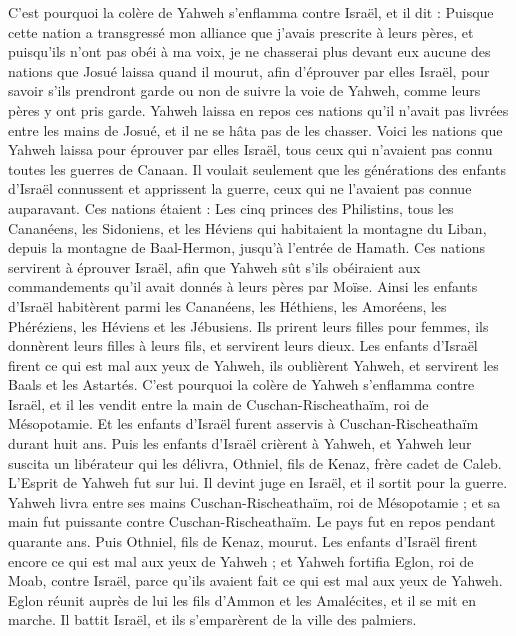 \begin{multicols}{2}
C'est pourquoi la colère de Yahweh s'enflamma contre Israël, et il dit : Puisque cette nation a transgressé mon alliance que j'avais prescrite à leurs pères, et puisqu’ils n'ont pas obéi à ma voix,
je ne chasserai plus devant eux aucune des nations que Josué laissa quand il mourut,
afin d'éprouver par elles Israël, pour savoir s'ils prendront garde ou non de suivre la voie de Yahweh, comme leurs pères y ont pris garde.
Yahweh laissa en repos ces nations qu'il n'avait pas livrées entre les mains de Josué, et il ne se hâta pas de les chasser.
\VerseOne{}Voici les nations que Yahweh laissa pour éprouver par elles Israël, tous ceux qui n'avaient pas connu toutes les guerres de Canaan.
Il voulait seulement que les générations des enfants d'Israël connussent et apprissent la guerre, ceux qui ne l’avaient pas connue auparavant.
Ces nations étaient : Les cinq princes des Philistins, tous les Cananéens, les Sidoniens, et les Héviens qui habitaient la montagne du Liban, depuis la montagne de Baal-Hermon, jusqu'à l'entrée de Hamath.
Ces nations servirent à éprouver Israël, afin que  Yahweh sût s'ils obéiraient aux commandements qu’il avait donnés à leurs pères par Moïse.
Ainsi les enfants d'Israël habitèrent parmi les Cananéens, les Héthiens, les Amoréens, les Phéréziens, les Héviens et les Jébusiens.
Ils prirent leurs filles pour femmes, ils donnèrent leurs filles à leurs fils, et servirent leurs dieux.
Les enfants d'Israël firent ce qui est mal aux yeux de Yahweh, ils oublièrent Yahweh, et servirent les Baals et les Astartés.
C'est pourquoi la colère de Yahweh s'enflamma contre Israël, et il les vendit entre la main de Cuschan-Rischeathaïm, roi de Mésopotamie. Et les enfants d'Israël furent asservis à Cuschan-Rischeathaïm durant huit ans.
Puis les enfants d'Israël crièrent à Yahweh, et Yahweh leur suscita un libérateur qui les délivra, Othniel, fils de Kenaz, frère cadet de Caleb.
L’Esprit de Yahweh fut sur lui. Il devint juge en Israël, et il sortit pour la guerre. Yahweh livra entre ses mains Cuschan-Rischeathaïm, roi de Mésopotamie ; et sa main fut puissante contre Cuschan-Rischeathaïm.
Le pays fut en repos pendant quarante ans. Puis Othniel, fils de Kenaz, mourut.
Les enfants d'Israël firent encore ce qui est mal aux yeux de Yahweh ; et Yahweh fortifia Eglon, roi de Moab, contre Israël, parce qu'ils avaient fait ce qui est mal aux yeux de Yahweh.
Eglon réunit auprès de lui les fils d'Ammon et les Amalécites, et il se mit en marche. Il battit Israël, et ils s'emparèrent de la ville des palmiers.

\end{multicols}
